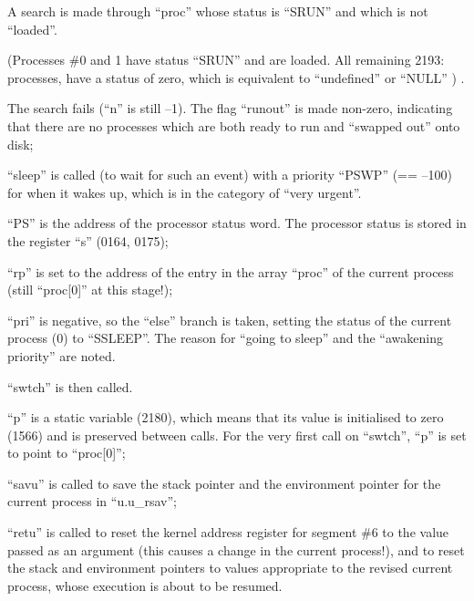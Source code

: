 \bd
\item[1960:] A search is made through ``proc''
 whose status is
``SRUN'' and which is not ``loaded''.
\ed

(Processes \#0 and 1 have status ``SRUN''
and are loaded. All remaining 2193:
processes, have a status of zero, which
is equivalent to ``undefined'' or 
``NULL'' ) .

\bd
\item[1966:] The search fails (``n'' is still
 --1). The flag ``runout'' is made
 non-zero, indicating that there
 are no processes which are both
 ready to run and ``swapped out''
 onto disk;

\item[1968:] ``sleep'' is called (to wait for
 such an event) with a priority
 ``PSWP'' (== --100) for when it
 wakes up, which is in the
 category of ``very urgent''.
\ed


\bd
\item[2070:] ``PS'' is the address of the processor status word. The processor
 status is stored in the register
 ``s'' (0164, 0175);

\item[2071:] ``rp'' is set to the address of the
 entry in the array ``proc'' of the
 current process (still ``proc[0]''
 at this stage!);

\item[2072:] ``pri'' is negative, so the ``else''
 branch is taken, setting the
 status of the current process
 (0) to ``SSLEEP''. The reason for
 ``going to sleep'' and the ``awakening priority'' are noted.

\item[2093:] ``swtch'' is then called.
\ed


\bd
\item[2184:] ``p'' is a static variable (2180),
 which means that its value is
 initialised to zero (1566) and is
 preserved between calls. For the
 very first call on ``swtch'', ``p''
 is set to point to ``proc[0]'';

\item[2189:] ``savu'' is called to save the
stack pointer and the environment
pointer for the current process
in ``u.u\_rsav'';

\item[2193:] ``retu'' is called
to reset the kernel address
register for segment \#6 to the
value passed as an argument
(this causes a change in the
current process!), and
 to reset the stack and environment pointers to values
 appropriate to the revised
 current process, whose execution
 is about to be resumed.
\ed

